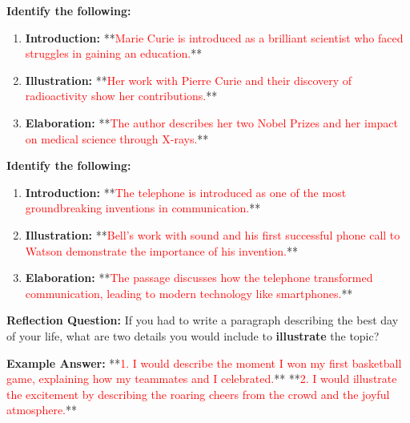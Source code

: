 \documentclass[12pt]{article}
\begin{document}
\begin{tcolorbox}[colframe=black!60, colback=white, 
coltitle=black, colbacktitle=black!15, fonttitle=\bfseries\Large, 
title=Guided Practice: The Life of Marie Curie, halign title=center, left=10pt, right=10pt, top=10pt, bottom=15pt]

\textbf{Identify the following:}
\begin{enumerate}
    \item \textbf{Introduction:} **\textcolor{red}{Marie Curie is introduced as a brilliant scientist who faced struggles in gaining an education.}**  
    \item \textbf{Illustration:} **\textcolor{red}{Her work with Pierre Curie and their discovery of radioactivity show her contributions.}**  
    \item \textbf{Elaboration:} **\textcolor{red}{The author describes her two Nobel Prizes and her impact on medical science through X-rays.}**  
\end{enumerate}
\end{tcolorbox}

\vspace{1em}

\begin{tcolorbox}[colframe=black!60, colback=white, 
coltitle=black, colbacktitle=black!15, fonttitle=\bfseries\Large, 
title=Independent Practice: The Invention of the Telephone, halign title=center, left=10pt, right=10pt, top=10pt, bottom=15pt]

\textbf{Identify the following:}
\begin{enumerate}
    \item \textbf{Introduction:} **\textcolor{red}{The telephone is introduced as one of the most groundbreaking inventions in communication.}**  
    \item \textbf{Illustration:} **\textcolor{red}{Bell’s work with sound and his first successful phone call to Watson demonstrate the importance of his invention.}**  
    \item \textbf{Elaboration:} **\textcolor{red}{The passage discusses how the telephone transformed communication, leading to modern technology like smartphones.}**  
\end{enumerate}
\end{tcolorbox}

\vspace{1em}

\begin{tcolorbox}[colframe=black!60, colback=white, 
coltitle=black, colbacktitle=black!15, fonttitle=\bfseries\Large, 
title=Exit Ticket, halign title=center, left=10pt, right=10pt, top=10pt, bottom=15pt]

\textbf{Reflection Question:}
If you had to write a paragraph describing the best day of your life, what are two details you would include to \textbf{illustrate} the topic?

\textbf{Example Answer:}
**\textcolor{red}{1. I would describe the moment I won my first basketball game, explaining how my teammates and I celebrated.}**  
**\textcolor{red}{2. I would illustrate the excitement by describing the roaring cheers from the crowd and the joyful atmosphere.}**

\end{tcolorbox}
\end{document}
